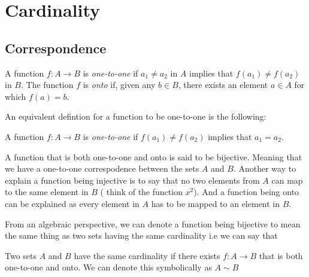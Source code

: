 


\section{Cardinality}

\subsection{Correspondence}

\begin{definition}{}{}
    A function \( f: A \to B \) is \textit{one-to-one} if \( a_1 \neq a_2 \) in \( A \) implies that 
    \( f(a_1) \neq f(a_2) \) in \( B \). The function \( f \) is \textit{onto} if, given any \( b \in B \), there exists an element \( a \in A \) for which \( f(a) = b\).
\end{definition}

An equivalent defintion for a function to be one-to-one is the following:

\begin{definition}{}{}
    A function \( f: A \to B \) is \textit{one-to-one} if \( f(a_1) \neq f(a_2) \) implies that \( a_1 = a_2 \).
\end{definition}
    
A function that is both one-to-one and onto is said to be bijective. Meaning that we have a one-to-one correspodence between the sets \( A \) and \( B \). Another way to explain a function being injective is to say that no two elements from \( A \) can map to the same element in \( B \) ( think of the function \( x^2\)). And a function being onto can be explained as every element in \( A \) has to be mapped to an element in \( B \).

From an algebraic perspective, we can denote a function being bijective to mean the same thing as two sets having the same cardinality i.e we can say that 

\begin{definition}{}{}
Two sets \( A \) and \( B \) have the same cardinality if there exists \( f: A \to B \) that is both one-to-one and onto. We can denote this symbolically as \( A \sim B\)
\end{definition}

